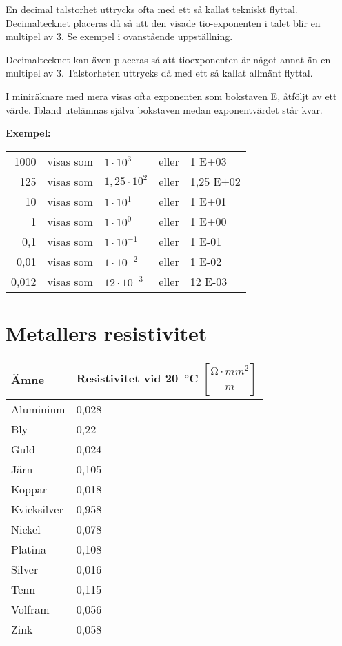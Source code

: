 En decimal talstorhet uttrycks ofta med ett så kallat tekniskt flyttal.
Decimaltecknet placeras då så att den visade tio-exponenten i talet
blir en multipel av 3.
Se exempel i ovanstående uppställning.

Decimaltecknet kan även placeras så att tioexponenten är något annat
än en multipel av 3.
Talstorheten uttrycks då med ett så kallat allmänt flyttal.

I miniräknare med mera visas ofta exponenten som bokstaven E, åtföljt av
ett värde.
Ibland utelämnas själva bokstaven medan exponentvärdet står kvar.

\noindent\textbf{Exempel:}

\begin{tabular}{rllll}
1000  & visas som & \(1    \cdot 10^3  \) & eller & 1 E+03 \\
125   & visas som & \(1,25 \cdot 10^2  \) & eller & 1,25 E+02 \\
10    & visas som & \(1    \cdot 10^1  \) & eller & 1 E+01 \\
1     & visas som & \(1    \cdot 10^0  \) & eller & 1 E+00 \\
0,1   & visas som & \(1    \cdot 10^{-1}\) & eller & 1 E-01 \\
0,01  & visas som & \(1    \cdot 10^{-2}\) & eller & 1 E-02 \\
0,012 & visas som & \(12   \cdot 10^{-3}\) & eller & 12 E-03 \\
\end{tabular}

\section{Metallers resistivitet}
\label{metallersresistivitet}

\begin{tabular}{l|l}
  Ämne & Resistivitet vid \SI{20}{\degreeCelsius} \([\dfrac{\si{\ohm} \cdot mm^2}{m}]\) \\
  \hline
  Aluminium   & 0,028 \\
  Bly         & 0,22  \\
  Guld        & 0,024 \\
  Järn        & 0,105 \\
  Koppar      & 0,018 \\
  Kvicksilver & 0,958 \\
  Nickel      & 0,078 \\
  Platina     & 0,108 \\
  Silver      & 0,016 \\
  Tenn        & 0,115 \\
  Volfram     & 0,056 \\
  Zink        & 0,058 \\
\end{tabular}


